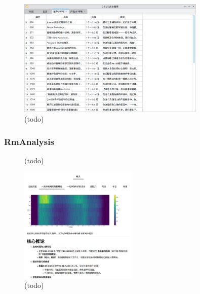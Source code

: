 \begin{figure}[htbp]
	\centering
	\includegraphics[width=0.8\textwidth]{./exp/rma-feat.png}
	\caption{(todo)}
	\label{fig:rma-feat}
\end{figure}

\subsubsection{RmAnalysis}

\begin{figure}[htbp]
    \hfill
	\caption{(todo)}
	\label{fig:aly-core}
\end{figure}

\begin{figure}[htbp]
	\centering
	\includegraphics[width=0.5\textwidth]{./exp/aly-demo-1.png}
	\caption{(todo)}
	\label{fig:aly-demo-1}
\end{figure}

